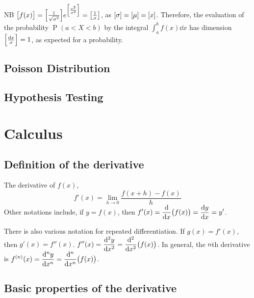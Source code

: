 \documentclass[fleqn,a4paper,11pt]{article}
\DeclareMathOperator{\Prob}{\mathrm P}
\begin{document}
    NB \(\bqty{f(x)} =
        \bqty{\frac 1{\sqrt{\sigma^2}}}
        e^{\bqty{\frac{x^2}{\sigma^2}}}
      = \bqty{\frac 1\sigma}\), as
    \(\bqty{\sigma} = \bqty{\mu} = \bqty{x}\). Therefore, the
    evaluation of the probability \(\Prob(a < X < b)\) by the integral
    \(\int_a^bf(x) \dd{x}\) has dimension
    \(\bqty{\frac{\dd{x}}{\sigma}} = 1\), as expected for a probability.

    \subsection{Poisson Distribution}


    \subsection{Hypothesis Testing}


    \section{Calculus}


    \subsection{Definition of the derivative}

    The derivative of \(f(x)\),
    \begin{equation}
    f'(x) = \lim_{h \to 0} \frac{f(x + h) - f(x)}{h}
    \end{equation}
    Other notations include, if \(y = f(x)\), then
    \(\displaystyle f'(x) = \dv{x}(f(x)) = \dv{y}{x} = y'\).

    There is also various notation for repeated differentiation. If
    \(g(x) = f'(x)\), then \(g'(x) = f''(x)\).
    \(\displaystyle f''(x) = \dv[2]{y}{x} = \dv[2]{x}(f(x))\). In general, the
    \(n\)th derivative is
    \(\displaystyle f^{(n)}(x) = \dv[n]{y}{x} = \dv[n]{x}(f(x))\).

    \subsection{Basic properties of the derivative}
    \label{sec_calc_derivative_properties}
\end{document}
